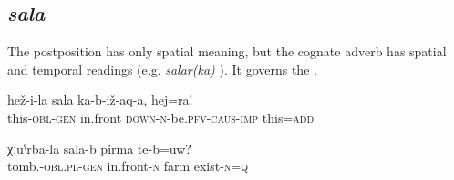 
\subsection{\textit{sala} }
\label{ssec:postposition sala}
The postposition  has only spatial meaning, but the cognate adverb has spatial and temporal readings (e.g. \textit{salar(ka)} ). It governs the .
%
\begin{exe}
	\ex
	\begin{xlist}
		\ex	\label{Put this before of this, and this also}
		\gll	hež-i-la	sala	ka-b-iž-aq-a,	hej=ra!\\
			this-\textsc{obl}-\textsc{gen}	in.front	\textsc{down-n}-be.\textsc{pfv}-\textsc{caus}-\textsc{imp}	this=\textsc{add}\\
		\glt	{}

		\ex	\label{Is there a farm in front of the graveyard}
		\gll	χːuˁrba-la	sala-b	pirma	te-b=uw?\\
			tomb.-\textsc{obl.pl-gen}	in.front-\textsc{n}	farm	exist-\textsc{n}=\textsc{q}\\
		\glt	{}
	\end{xlist}
\end{exe}



\subsection{ }
\label{ssec:postposition sa}

